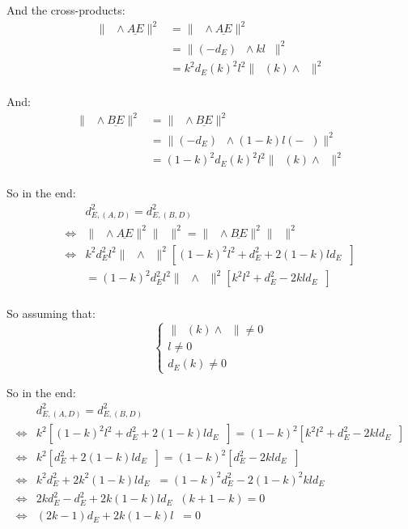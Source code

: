 \documentclass[10pt,a4paper]{article}
\newcommand{\ud}[1]{\underline{#1}}
\DeclareMathOperator{\cross}{\wedge}
\DeclareMathOperator{\AD}{\ud{AD}}
\DeclareMathOperator{\BD}{\ud{BD}}
\DeclareMathOperator{\ED}{\ud{ED}}
\DeclareMathOperator{\e}{\ud{e}}
\DeclareMathOperator{\n}{\ud{n}}
\DeclareMathOperator{\en}{\ud{e}\cdot\ud{n}}
\begin{document}
And the cross-products:
$$
\begin{array}{lll}
    \| \AD \cross \ud{AE} \|^2
    & = \| \ED \cross \ud{AE} \|^2\\
    & = \| (-d_E)\n \cross kl\e \|^2\\
    & = k^2d_E(k)^2l^2 \| \n(k) \cross \e \|^2\\
\end{array}
$$

And:
$$
\begin{array}{lll}
    \| \BD \cross \ud{BE} \|^2
    & = \| \ED \cross \ud{BE} \|^2\\
    & = \| (-d_E)\n \cross (1-k)l(-\e) \|^2\\
    & = (1-k)^2d_E(k)^2l^2 \| \n(k) \cross \e \|^2\\
\end{array}
$$

So in the end:
$$
\begin{array}{lll}
    & d_{E, (A,D)}^2 = d_{E, (B,D)}^2\\
    \Leftrightarrow &
    \| \AD \cross \ud{AE} \|^2 \| \BD \|^2
    = \| \BD \cross \ud{BE} \|^2 \| \AD \|^2\\
    \Leftrightarrow &
    k^2d_E^2l^2 \| \n \cross \e \|^2
    \left[ (1-k)^2l^2 + d_E^2 + 2 (1-k)ld_E \en \right]\\
    & = (1-k)^2d_E^2l^2 \| \n \cross \e \|^2
    \left[ k^2l^2 + d_E^2 - 2 kld_E \en \right]\\
\end{array}
$$

So assuming that:
$$
\left\{
    \begin{array}{ll}
        \| \n(k) \cross \e \| \neq 0\\
        l \neq 0\\
        d_E(k) \neq 0
    \end{array}
\right.
$$

So in the end:
$$
\begin{array}{lll}
    & d_{E, (A,D)}^2 = d_{E, (B,D)}^2\\
    \Leftrightarrow &
    k^2 \left[ (1-k)^2l^2 + d_E^2 + 2 (1-k)ld_E \en \right]
    = (1-k)^2 \left[ k^2l^2 + d_E^2 - 2 kld_E \en \right]\\
    \Leftrightarrow &
    k^2 \left[ d_E^2 + 2 (1-k)ld_E \en \right]
    = (1-k)^2 \left[ d_E^2 - 2 kld_E \en \right]\\
    \Leftrightarrow &
    k^2d_E^2 + 2 k^2(1-k)ld_E \en
    = (1-k)^2d_E^2 - 2(1-k)^2kld_E \en\\
    \Leftrightarrow &
    2kd_E^2 - d_E^2 + 2k(1-k)ld_E\en(k + 1 - k) = 0\\
    \Leftrightarrow &
    (2k - 1)d_E + 2k(1-k)l\en = 0\\
\end{array}
$$
\end{document}
